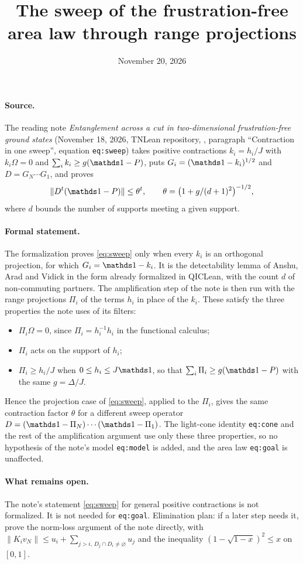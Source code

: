 \documentclass{article}
\title{The sweep of the frustration-free area law through range projections}
\author{}
\date{November 20, 2026}
\begin{document}
\maketitle
{}

\paragraph{Source.}
The reading note \emph{Entanglement across a cut in two-dimensional
    frustration-free ground states} (November 18, 2026,
TNLean repository, ,
paragraph ``Contraction in one sweep'', equation \texttt{eq:sweep}) takes
positive contractions $k_i=h_i/J$ with $k_i\Omega=0$ and
$\sum_ik_i\ge g(\Id-P)$, puts $G_i=(\Id-k_i)^{1/2}$ and $D=G_N\cdots G_1$, and
proves
\begin{equation}
    \|D^t(\Id-P)\|\le\theta^t,\qquad \theta=\bigl(1+g/(d+1)^2\bigr)^{-1/2},
    \label{eq:sweep}
\end{equation}
where $d$ bounds the number of supports meeting a given support.

\paragraph{Formal statement.}
The formalization proves \eqref{eq:sweep} only when every $k_i$ is an
orthogonal projection, for which $G_i=\Id-k_i$. It is the detectability lemma
of Anshu, Arad and Vidick in the form already formalized in QICLean, with the
count $d$ of non-commuting partners. The amplification step of the note is
then run with the range projections $\Pi_i$ of the terms $h_i$ in place of the
$k_i$. These satisfy the three properties the note uses of its filters:
\begin{itemize}
    \item $\Pi_i\Omega=0$, since $\Pi_i=h_i^{-1}h_i$ in the functional calculus;
    \item $\Pi_i$ acts on the support of $h_i$;
    \item $\Pi_i\ge h_i/J$ when $0\le h_i\le J\Id$, so that
          $\sum_i\Pi_i\ge g(\Id-P)$ with the same $g=\Delta/J$.
\end{itemize}
Hence the projection case of \eqref{eq:sweep}, applied to the $\Pi_i$, gives
the same contraction factor $\theta$ for a different sweep operator
$D=(\Id-\Pi_N)\cdots(\Id-\Pi_1)$. The light-cone identity
\texttt{eq:cone} and the rest of the amplification argument use only these
three properties, so no hypothesis of the note's model \texttt{eq:model} is
added, and the area law \texttt{eq:goal} is unaffected.

\paragraph{What remains open.}
The note's statement \eqref{eq:sweep} for general positive contractions is not
formalized. It is not needed for \texttt{eq:goal}. Elimination plan: if a later
step needs it, prove the norm-loss argument of the note directly, with
$\|K_iv_N\|\le u_i+\sum_{j>i,\,D_j\cap D_i\ne\varnothing}u_j$ and the
inequality $(1-\sqrt{1-x})^2\le x$ on $[0,1]$.
\end{document}
